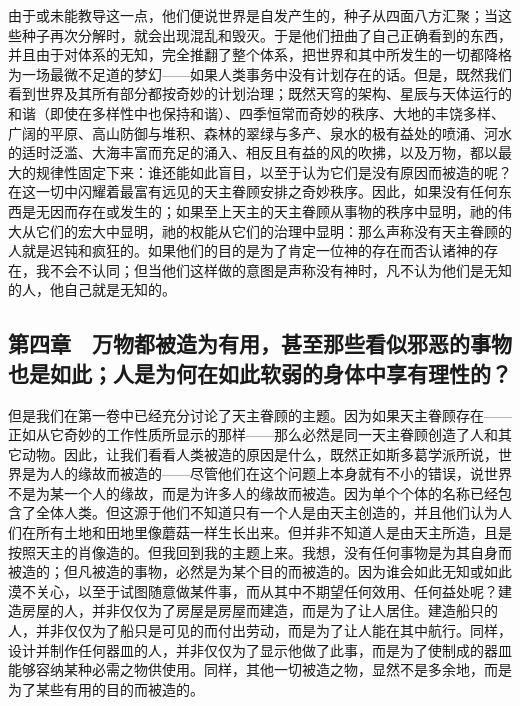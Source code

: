 由于或未能教导这一点，他们便说世界是自发产生的，种子从四面八方汇聚；当这些种子再次分解时，就会出现混乱和毁灭。于是他们扭曲了自己正确看到的东西，并且由于对体系的无知，完全推翻了整个体系，把世界和其中所发生的一切都降格为一场最微不足道的梦幻——如果人类事务中没有计划存在的话。但是，既然我们看到世界及其所有部分都按奇妙的计划治理；既然天穹的架构、星辰与天体运行的和谐（即使在多样性中也保持和谐）、四季恒常而奇妙的秩序、大地的丰饶多样、广阔的平原、高山防御与堆积、森林的翠绿与多产、泉水的极有益处的喷涌、河水的适时泛滥、大海丰富而充足的涌入、相反且有益的风的吹拂，以及万物，都以最大的规律性固定下来：谁还能如此盲目，以至于认为它们是没有原因而被造的呢？在这一切中闪耀着最富有远见的天主眷顾安排之奇妙秩序。因此，如果没有任何东西是无因而存在或发生的；如果至上天主的天主眷顾从事物的秩序中显明，祂的伟大从它们的宏大中显明，祂的权能从它们的治理中显明：那么声称没有天主眷顾的人就是迟钝和疯狂的。如果他们的目的是为了肯定一位神的存在而否认诸神的存在，我不会不认同；但当他们这样做的意图是声称没有神时，凡不认为他们是无知的人，他自己就是无知的。\par


\subsection{第四章　万物都被造为有用，甚至那些看似邪恶的事物也是如此；人是为何在如此软弱的身体中享有理性的？}

但是我们在第一卷中已经充分讨论了天主眷顾的主题。因为如果天主眷顾存在——正如从它奇妙的工作性质所显示的那样——那么必然是同一天主眷顾创造了人和其它动物。因此，让我们看看人类被造的原因是什么，既然正如斯多葛学派所说，世界是为人的缘故而被造的——尽管他们在这个问题上本身就有不小的错误，说世界不是为某一个人的缘故，而是为许多人的缘故而被造。因为单个个体的名称已经包含了全体人类。但这源于他们不知道只有一个人是由天主创造的，并且他们认为人们在所有土地和田地里像蘑菇一样生长出来。但并非不知道人是由天主所造，且是按照天主的肖像造的。但我回到我的主题上来。我想，没有任何事物是为其自身而被造的；但凡被造的事物，必然是为某个目的而被造的。因为谁会如此无知或如此漠不关心，以至于试图随意做某件事，而从其中不期望任何效用、任何益处呢？建造房屋的人，并非仅仅为了房屋是房屋而建造，而是为了让人居住。建造船只的人，并非仅仅为了船只是可见的而付出劳动，而是为了让人能在其中航行。同样，设计并制作任何器皿的人，并非仅仅为了显示他做了此事，而是为了使制成的器皿能够容纳某种必需之物供使用。同样，其他一切被造之物，显然不是多余地，而是为了某些有用的目的而被造的。\par


